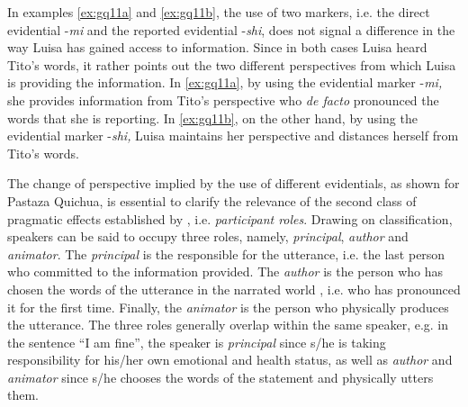 \documentclass[output=paper]{langsci/langscibook}
\begin{document}
In examples \ref{ex:gq11a} and \ref{ex:gq11b}, the use of two markers, i.e. the direct evidential -\textit{mi} and the reported evidential -\textit{shi}, does not signal a difference in the way Luisa has gained access to information. Since in both cases Luisa heard Tito’s words, it rather points out the two different perspectives from which Luisa is providing the information. In \ref{ex:gq11a}, by using the evidential marker -\textit{mi,} she provides information from Tito’s perspective who \textit{de facto} pronounced the words that she is reporting. In \ref{ex:gq11b}, on the other hand, by using the evidential marker -\textit{shi,} Luisa maintains her perspective and distances herself from Tito’s words.

The change of perspective implied by the use of different evidentials, as shown for Pastaza Quichua, is essential to clarify the relevance of the second class of pragmatic effects established by \citet{Hanks2012}, i.e. \textit{participant roles}. Drawing on  classification, speakers can be said to occupy three roles, namely, \textit{principal}, \textit{author} and \textit{animator}. The \textit{principal} is the responsible for the utterance, i.e. the last person who committed to the information provided. The \textit{author} is the person who has chosen the words of the utterance in the narrated world \citep{Goffman1981}, i.e. who has pronounced it for the first time. Finally, the \textit{animator} is the person who physically produces the utterance. The three roles generally overlap within the same speaker, e.g. in the sentence “I am fine”, the speaker is \textit{principal} since s/he is taking responsibility for his/her own emotional and health status, as well as \textit{author} and \textit{animator} since s/he chooses the words of the statement and physically utters them. 
\end{document}
